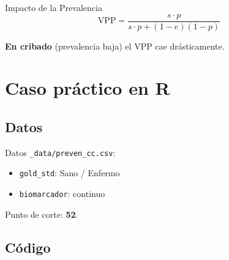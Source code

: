 \documentclass[
  ignorenonframetext,
  aspectratio=169,
]{beamer}
\providecommand{\tightlist}{%
  \setlength{\itemsep}{0pt}\setlength{\parskip}{0pt}}
\begin{document}
\begin{frame}{Impacto de la Prevalencia}
\[\text{VPP} = \frac{s \cdot p}{s \cdot p + (1-e)(1-p)}\]

\textbf{En cribado} (prevalencia baja) el VPP cae drásticamente.
\end{frame}

\begin{frame}
\end{frame}

\section{Caso práctico en R}\label{caso-pruxe1ctico-en-r}

\subsection{Datos}\label{datos}

\begin{frame}[fragile]{Datos}
\texttt{\_data/preven\_cc.csv}:

\begin{itemize}
\tightlist
\item
  \texttt{gold\_std}: Sano / Enfermo
\item
  \texttt{biomarcador}: continuo
\end{itemize}

Punto de corte: \textbf{52}.
\end{frame}

\begin{frame}
\end{frame}

\subsection{Código}\label{cuxf3digo}
\end{document}
